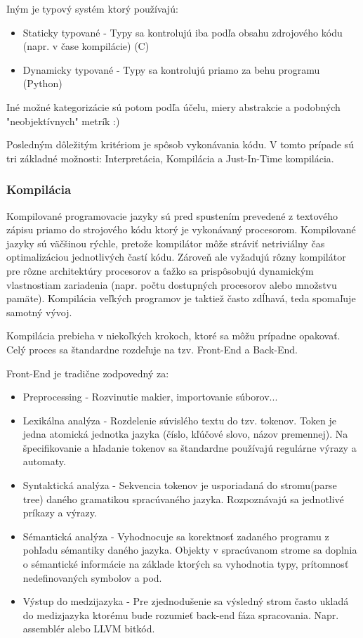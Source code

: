 \documentclass[a4paper,10pt]{article}
\begin{document}
\begin{multicols}{2}
	Iným je typový systém ktorý používajú:
	
	\begin{itemize}
		\item Staticky typované - Typy sa kontrolujú iba podľa obsahu zdrojového kódu (napr. v čase kompilácie) (C)
		\item Dynamicky typované - Typy sa kontrolujú priamo za behu programu (Python)
	\end{itemize}
	
	Iné možné kategorizácie sú potom podľa účelu, miery abstrakcie a podobných "neobjektívnych" metrík :)

	Posledným dôležitým kritériom je spôsob vykonávania kódu. V tomto prípade sú tri základné možnosti: Interpretácia, Kompilácia a Just-In-Time kompilácia.
	
	\subsubsection{Kompilácia}
	
		Kompilované programovacie jazyky sú pred spustením prevedené z textového zápisu priamo do strojového kódu ktorý je vykonávaný procesorom. Kompilované jazyky sú väčšinou rýchle, pretože kompilátor môže stráviť netriviálny čas optimalizáciou jednotlivých častí kódu. Zároveň ale vyžadujú rôzny kompilátor pre rôzne architektúry procesorov a ťažko sa prispôsobujú dynamickým vlastnostiam zariadenia (napr. počtu dostupných procesorov alebo množstvu pamäte). Kompilácia veľkých programov je taktiež často zdĺhavá, teda spomaľuje samotný vývoj.
		
		Kompilácia prebieha v niekoľkých krokoch, ktoré sa môžu prípadne opakovať. Celý proces sa štandardne rozdeľuje na tzv. Front-End a Back-End.
		
		Front-End je tradične zodpovedný za:
		
		\begin{itemize}
			\item Preprocessing - Rozvinutie makier, importovanie súborov...
			\item Lexikálna analýza - Rozdelenie súvislého textu do tzv. tokenov. Token je jedna atomická jednotka jazyka (číslo, kľúčové slovo, názov premennej). Na špecifikovanie a hľadanie tokenov sa štandardne používajú regulárne výrazy a automaty.
			\item Syntaktická analýza - Sekvencia tokenov je usporiadaná do stromu(parse tree) daného gramatikou spracúvaného jazyka. Rozpoznávajú sa jednotlivé príkazy a výrazy.
			\item Sémantická analýza - Vyhodnocuje sa korektnosť zadaného programu z pohľadu sémantiky daného jazyka. Objekty v spracúvanom strome sa doplnia o sémantické informácie na základe ktorých sa vyhodnotia typy, prítomnosť nedefinovaných symbolov a pod.
			\item Výstup do medzijazyka - Pre zjednodušenie sa výsledný strom často ukladá do medizjazyka ktorému bude rozumieť back-end fáza spracovania. Napr. assemblér alebo LLVM bitkód.
		\end{itemize}
		

\end{multicols}
\end{document}
